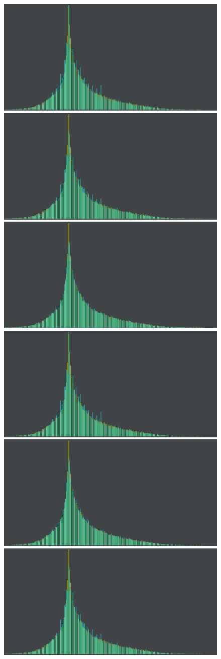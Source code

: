 \begin{figure}
	\centering
	{\includegraphics[width=0.48\linewidth]{img/histogram/different-metrics/bhattacharyya.png}}
	{\includegraphics[width=0.48\linewidth]{img/histogram/different-metrics/chi_square.png}}
	{\includegraphics[width=0.48\linewidth]{img/histogram/different-metrics/emd.png}}
	{\includegraphics[width=0.48\linewidth]{img/histogram/different-metrics/euclidean.png}}
	{\includegraphics[width=0.48\linewidth]{img/histogram/different-metrics/intersection.png}}
	{\includegraphics[width=0.48\linewidth]{img/histogram/different-metrics/kolmogorov_smirnov.png}}

\end{figure}
